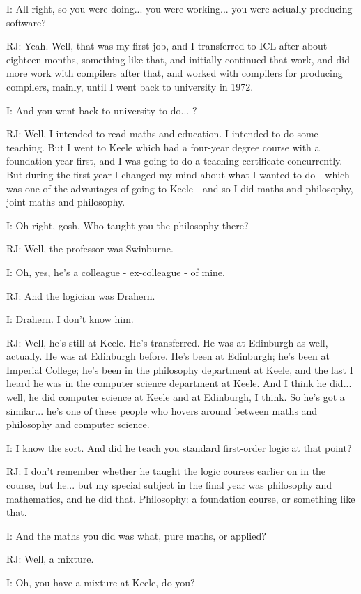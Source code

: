 \documentclass[10pt,titlepage]{book}
\begin{document}
I: All right, so you were doing... you were working... you were actually producing software?

RJ: Yeah. Well, that was my first job, and I transferred to ICL after about eighteen months, something like that, and initially continued that work, and did more work with compilers after that, and worked with compilers for producing compilers, mainly, until I went back to university in 1972.

I: And you went back to university to do... ?

RJ: Well, I intended to read maths and education. I intended to do some teaching. But I went to Keele which had a four-year degree course with a foundation year first, and I was going to do a teaching certificate concurrently. But during the first year I changed my mind about what I wanted to do - which was one of the advantages of going to Keele - and so I did maths and philosophy, joint maths and philosophy.

I: Oh right, gosh. Who taught you the philosophy there?

RJ: Well, the professor was Swinburne.

I: Oh, yes, he's a colleague - ex-colleague - of mine.

RJ: And the logician was 	Drahern.

I: Drahern. I don't know him.

RJ: Well, he's still at Keele. He's transferred. He was at Edinburgh as well, actually. He was at Edinburgh before. He's been at Edinburgh; he's been at Imperial College; he's been in the philosophy department at Keele, and the last I heard he was in the computer science department at Keele. And I think he did... well, he did computer science at Keele and at Edinburgh, I think. So he's got a similar... he's one of these people who hovers around between maths and philosophy and computer science.

I: I know the sort. And did he teach you standard first-order logic at that point?

RJ: I don't remember whether he taught the logic courses earlier on in the course, but he... but my special subject in the final year was philosophy and mathematics, and he did that. Philosophy: a foundation course, or something like that.

I: And the maths you did was what, pure maths, or applied?

RJ: Well, a mixture.

I: Oh, you have a mixture at Keele, do you?
\end{document}
